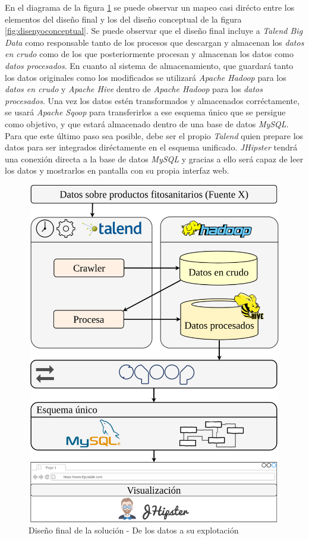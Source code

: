 En el diagrama de la figura \ref{fig:disenyofinal} se puede observar un mapeo casi dirécto entre los elementos del diseño final y los del diseño conceptual de la figura \ref{fig:disenyoconceptual}. Se puede observar que el diseño final incluye a \textit{Talend Big Data} como responsable tanto de los procesos que descargan y almacenan los \textit{datos en crudo} como de los que posteriormente procesan y almacenan los datos como \textit{datos procesados}. En cuanto al sistema de almacenamiento, que guardará tanto los datos originales como los modificados se utilizará \textit{Apache Hadoop} para los \textit{datos en crudo} y \textit{Apache Hive} dentro de \textit{Apache Hadoop} para los \textit{datos procesados}. Una vez los datos estén transformados y almacenados corréctamente, se usará \textit{Apache Sqoop} para transferirlos a ese esquema único que se persigue como objetivo, y que estará almacenado dentro de una base de datos \textit{MySQL}. Para que este último paso sea posible, debe ser el propio \textit{Talend} quien prepare los datos para ser integrados diréctamente en el esquema unificado. \textit{JHipster} tendrá una conexión directa a la base de datos \textit{MySQL} y gracias a ello será capaz de leer los datos y mostrarlos en pantalla con su propia interfaz web. 
\begin{figure}[H]
    \centering
    \includegraphics[width=1\textwidth,height=15cm,keepaspectratio]{Imagenes/disenyofinal}
    \caption{Diseño final de la solución - De los datos a su explotación}
    \label{fig:disenyofinal}
\end{figure}

